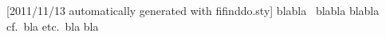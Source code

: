 [2011/11/13 automatically generated with fifinddo.sty]
blabla \textellipsis\unkern\ blabla
blabla cf.\ bla
etc.\ bla bla

